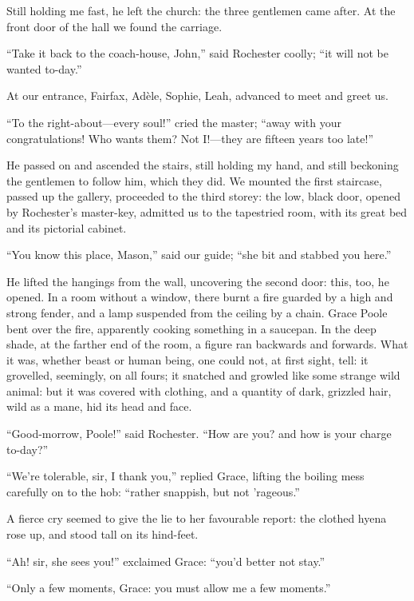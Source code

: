 Still holding me fast, he left the church: the three gentlemen came
after. At the front door of the hall we found the carriage.

\enquote{Take it back to the coach-house, John,} said \Mr{} Rochester
coolly; \enquote{it will not be wanted to-day.}

At our entrance, \Mrs{} Fairfax, Adèle, Sophie, Leah, advanced to meet and
greet us.

\enquote{To the right-about---every soul!} cried the master;
\enquote{away with your congratulations! Who wants them? Not I!---they
	are fifteen years too late!}

He passed on and ascended the stairs, still holding my hand, and still
beckoning the gentlemen to follow him, which they did. We mounted the
first staircase, passed up the gallery, proceeded to the third storey:
the low, black door, opened by \Mr{} Rochester's master-key, admitted us
to the tapestried room, with its great bed and its pictorial cabinet.

\enquote{You know this place, Mason,} said our guide; \enquote{she bit
	and stabbed you here.}

He lifted the hangings from the wall, uncovering the second door: this,
too, he opened. In a room without a window, there burnt a fire guarded
by a high and strong fender, and a lamp suspended from the ceiling by a
chain. Grace Poole bent over the fire, apparently cooking something in
a saucepan. In the deep shade, at the farther end of the room, a figure
ran backwards and forwards. What it was, whether beast or human being,
one could not, at first sight, tell: it grovelled, seemingly, on all
fours; it snatched and growled like some strange wild animal: but it was
covered with clothing, and a quantity of dark, grizzled hair, wild as a
mane, hid its head and face.

\enquote{Good-morrow, \Mrs{} Poole!} said \Mr{} Rochester. \enquote{How are
	you? and how is your charge to-day?}

\enquote{We're tolerable, sir, I thank you,} replied Grace, lifting the
boiling mess carefully on to the hob: \enquote{rather snappish, but not
	'rageous.}

A fierce cry seemed to give the lie to her favourable report: the
clothed hyena rose up, and stood tall on its hind-feet.

\enquote{Ah! sir, she sees you!} exclaimed Grace: \enquote{you'd better
	not stay.}

\enquote{Only a few moments, Grace: you must allow me a few moments.}

